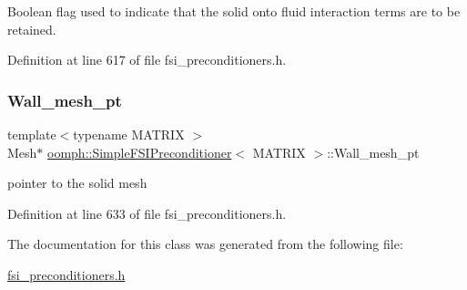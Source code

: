 Boolean flag used to indicate that the solid onto fluid interaction terms are to be retained. 



Definition at line 617 of file fsi\+\_\+preconditioners.\+h.

\mbox{\label{classoomph_1_1SimpleFSIPreconditioner_a3ad28ce867dc02b67f674ff8e159bff8}} 
\subsubsection{\texorpdfstring{Wall\+\_\+mesh\+\_\+pt}{Wall\_mesh\_pt}}
{\footnotesize\ttfamily template$<$typename M\+A\+T\+R\+IX $>$ \\
Mesh$\ast$ \hyperlink{classoomph_1_1SimpleFSIPreconditioner}{oomph\+::\+Simple\+F\+S\+I\+Preconditioner}$<$ M\+A\+T\+R\+IX $>$\+::Wall\+\_\+mesh\+\_\+pt\hspace{0.3cm}{\ttfamily [private]}}



pointer to the solid mesh 



Definition at line 633 of file fsi\+\_\+preconditioners.\+h.



The documentation for this class was generated from the following file\+:\begin{DoxyCompactItemize}
\item 
\hyperlink{fsi__preconditioners_8h}{fsi\+\_\+preconditioners.\+h}\end{DoxyCompactItemize}
